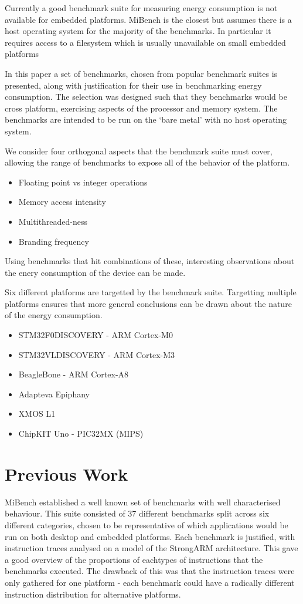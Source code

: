 \documentclass[twocolumn]{article}
\newcommand{\nsection}[1]{\section{\bfseries #1}}
\begin{document}
Currently a good benchmark suite for measuring energy consumption is not available for embedded platforms. MiBench is the closest but assumes there is a host operating system for the majority of the benchmarks. In particular it requires access to a filesystem which is usually unavailable on small embedded platforms

In this paper a set of benchmarks, chosen from popular benchmark suites is presented, along with justification for their use in benchmarking energy consumption. The selection was designed such that they benchmarks would be cross platform, exercising aspects of the processor and memory system. The benchmarks are intended to be run on the ‘bare metal’ with no host operating system.

We consider four orthogonal aspects that the benchmark suite must cover, allowing the range of benchmarks to expose all of the behavior of the platform.

\begin{itemize}
	\setlength{\itemsep}{-0.25em}
	\item Floating point vs integer operations
	\item Memory access intensity
	\item Multithreaded-ness
	\item Branding frequency
\end{itemize}

Using benchmarks that hit combinations of these, interesting observations about the enery consumption of the device can be made.

Six different platforms are targetted by the benchmark suite. Targetting multiple platforms ensures that more general conclusions can be drawn about the nature of the energy consumption.
\begin{itemize}
	\setlength{\itemsep}{-0.25em}
	\item STM32F0DISCOVERY - ARM Cortex-M0
	\item STM32VLDISCOVERY - ARM Cortex-M3
	\item BeagleBone - ARM Cortex-A8
	\item Adapteva Epiphany
	\item XMOS L1
	\item ChipKIT Uno - PIC32MX (MIPS)
\end{itemize}

\nsection{Previous Work}

MiBench established a well known set of benchmarks with well characterised behaviour. This suite consisted of 37 different benchmarks split across six different categories, chosen to be representative of which applications would be run on both desktop and embedded platforms. Each benchmark is justified, with instruction traces analysed on a model of the StrongARM architecture. This gave a good overview of the proportions of eachtypes of instructions that the benchmarks executed. The drawback of this was that the instruction traces were only gathered for one platform - each benchmark could have a radically different instruction distribution for alternative platforms.
\end{document}
